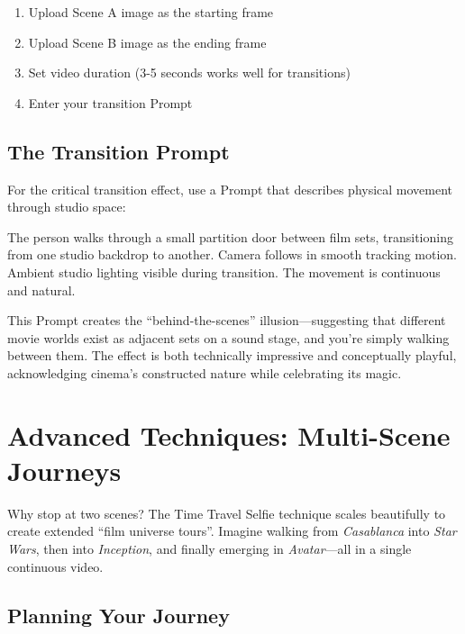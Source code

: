 \begin{enumerate}
\item Upload Scene A image as the starting frame
\item Upload Scene B image as the ending frame
\item Set video duration (3-5 seconds works well for transitions)
\item Enter your transition Prompt
\end{enumerate}

\subsection{The Transition Prompt}

For the critical transition effect, use a Prompt that describes physical movement through studio space:

\begin{Prompt}
The person walks through a small partition door between film sets, transitioning from one studio backdrop to another. Camera follows in smooth tracking motion. Ambient studio lighting visible during transition. The movement is continuous and natural.
\end{Prompt}

This Prompt creates the ``behind-the-scenes'' illusion—suggesting that different movie worlds exist as adjacent sets on a sound stage, and you're simply walking between them. The effect is both technically impressive and conceptually playful, acknowledging cinema's constructed nature while celebrating its magic.

\section{Advanced Techniques: Multi-Scene Journeys}
\label{sec:multi-scene}

Why stop at two scenes? The Time Travel Selfie technique scales beautifully to create extended ``film universe tours''. Imagine walking from \textit{Casablanca} into \textit{Star Wars}, then into \textit{Inception}, and finally emerging in \textit{Avatar}—all in a single continuous video.

\subsection{Planning Your Journey}

